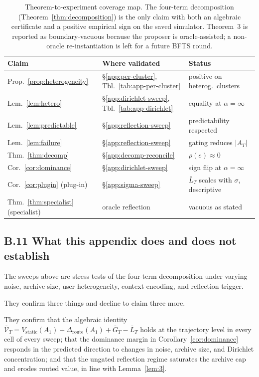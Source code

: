 \documentclass{article} %
\begin{document}
\begin{table}[h]
\centering
\small
\begin{tabular}{lll}
\toprule
Claim & Where validated & Status \\
\midrule
Prop.~\ref{prop:heterogeneity} & \S\ref{app:per-cluster}, Tbl.~\ref{tab:app-per-cluster} & positive on heterog.\ clusters \\
Lem.~\ref{lem:hetero} & \S\ref{app:dirichlet-sweep}, Tbl.~\ref{tab:app-dirichlet} & equality at $\alpha=\infty$ \\
Lem.~\ref{lem:predictable} & \S\ref{app:reflection-sweep} & predictability respected \\
Lem.~\ref{lem:failure} & \S\ref{app:reflection-sweep} & gating reduces $|A_T|$ \\
Thm.~\ref{thm:decomp} & \S\ref{app:decomp-reconcile} & $\rho(e)\approx 0$ \\
Cor.~\ref{cor:dominance} & \S\ref{app:dirichlet-sweep} & sign flip at $\alpha=\infty$ \\
Cor.~\ref{cor:plugin} (plug-in) & \S\ref{app:sigma-sweep} & $\bar{L}_T$ scales with $\sigma$, descriptive \\
Thm.~\ref{thm:specialist} (specialist) & oracle reflection & vacuous as stated \\
\bottomrule
\end{tabular}
\caption{Theorem-to-experiment coverage map. The four-term decomposition (Theorem~\ref{thm:decomposition}) is the only claim with both an algebraic certificate and a positive empirical sign on the saved simulator. Theorem~3 is reported as boundary-vacuous because the proposer is oracle-assisted; a non-oracle re-instantiation is left for a future BFTS round.}
\label{tab:app-coverage}
\end{table}

\subsection{B.11 What this appendix does and does not establish}

\label{app:what-not}

The sweeps above are stress tests of the four-term decomposition under varying noise, archive size, user heterogeneity, context encoding, and reflection trigger.

They confirm three things and decline to claim three more.

They confirm that the algebraic identity $\bar{\mathcal{V}}_T = V_{\mathrm{static}}(A_1)+\Delta_{\mathrm{route}}(A_1)+\bar{G}_T-\bar{L}_T$ holds at the trajectory level in every cell of every sweep; that the dominance margin in Corollary~\ref{cor:dominance} responds in the predicted direction to changes in noise, archive size, and Dirichlet concentration; and that the ungated reflection regime saturates the archive cap and erodes routed value, in line with Lemma~\ref{lem:3}.
\end{document}

